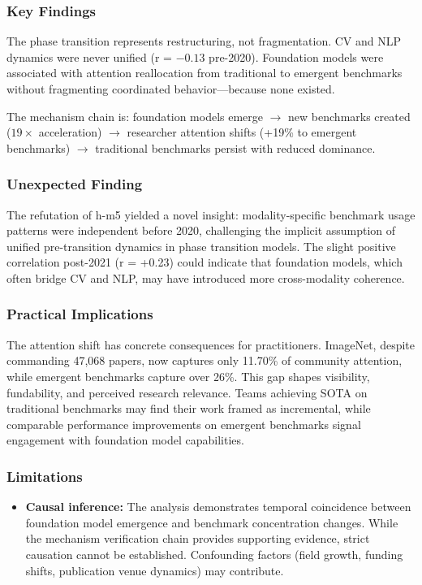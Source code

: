 
\subsubsection{Key Findings}

The phase transition represents restructuring, not fragmentation. CV and NLP dynamics were never unified (r = $-0.13$ pre-2020). Foundation models were associated with attention reallocation from traditional to emergent benchmarks without fragmenting coordinated behavior---because none existed.

The mechanism chain is: foundation models emerge $\rightarrow$ new benchmarks created ($19\times$ acceleration) $\rightarrow$ researcher attention shifts (+19\% to emergent benchmarks) $\rightarrow$ traditional benchmarks persist with reduced dominance.

\subsubsection{Unexpected Finding}

The refutation of h-m5 yielded a novel insight: modality-specific benchmark usage patterns were independent before 2020, challenging the implicit assumption of unified pre-transition dynamics in phase transition models. The slight positive correlation post-2021 (r = +0.23) could indicate that foundation models, which often bridge CV and NLP, may have introduced more cross-modality coherence.

\subsubsection{Practical Implications}

The attention shift has concrete consequences for practitioners. ImageNet, despite commanding 47,068 papers, now captures only 11.70\% of community attention, while emergent benchmarks capture over 26\%. This gap shapes visibility, fundability, and perceived research relevance. Teams achieving SOTA on traditional benchmarks may find their work framed as incremental, while comparable performance improvements on emergent benchmarks signal engagement with foundation model capabilities.

\subsubsection{Limitations}

\begin{itemize}
\item \textbf{Causal inference:} The analysis demonstrates temporal coincidence between foundation model emergence and benchmark concentration changes. While the mechanism verification chain provides supporting evidence, strict causation cannot be established. Confounding factors (field growth, funding shifts, publication venue dynamics) may contribute.
\end{itemize}

